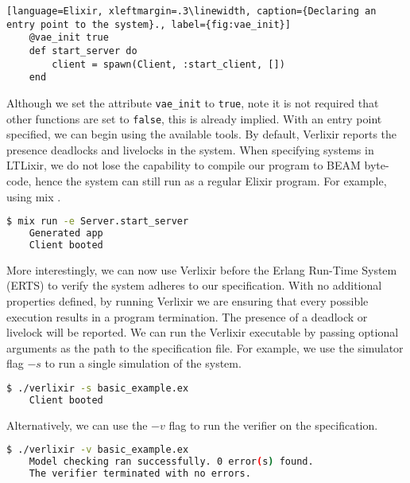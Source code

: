 \begin{lstlisting}[language=Elixir, xleftmargin=.3\linewidth, caption={Declaring an entry point to the system}., label={fig:vae_init}]
    @vae_init true
    def start_server do
        client = spawn(Client, :start_client, [])
    end
\end{lstlisting}
Although we set the attribute \texttt{vae\_init} to \texttt{true}, note it is not required that other functions are set to \texttt{false}, this is already implied. With an entry point specified, we can begin using the available tools. By default, Verlixir reports the presence deadlocks and livelocks in the system. When specifying systems in LTLixir, we do not lose the capability to compile our program to BEAM byte-code, hence the system can still run as a regular Elixir program. For example, using mix \cite{mix}.
\begin{lstlisting}[language=bash, xleftmargin=.3\linewidth]
    $ mix run -e Server.start_server
    Generated app
    Client booted
\end{lstlisting}
More interestingly, we can now use Verlixir before the Erlang Run-Time System (ERTS) to verify the system adheres to our specification. With no additional properties defined, by running Verlixir we are ensuring that every possible execution results in a program termination. The presence of a deadlock or livelock will be reported. We can run the Verlixir executable by passing optional arguments as the path to the specification file. For example, we use the simulator flag $-s$ to run a single simulation of the system.
\begin{lstlisting}[language=bash, xleftmargin=.3\linewidth]
    $ ./verlixir -s basic_example.ex 
    Client booted
\end{lstlisting}
Alternatively, we can use the $-v$ flag to run the verifier on the specification.
\begin{lstlisting}[language=bash, xleftmargin=.3\linewidth]
    $ ./verlixir -v basic_example.ex 
    Model checking ran successfully. 0 error(s) found.
    The verifier terminated with no errors.
\end{lstlisting}
